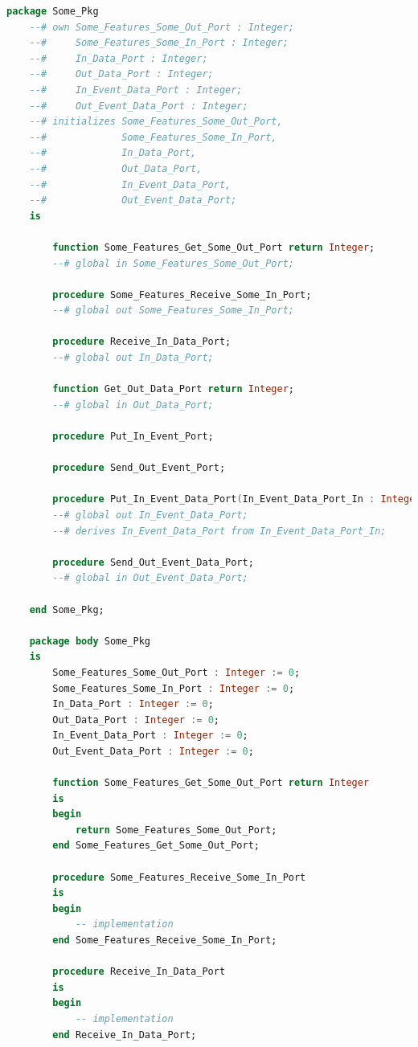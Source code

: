 \singlespacing
\begin{lstlisting}[language=ada, frame=single, gobble=0, caption={Translation of sample AADL package from listing \ref{lst:aadl_sample}}]
	package Some_Pkg
	--# own Some_Features_Some_Out_Port : Integer;
	--#     Some_Features_Some_In_Port : Integer;
	--#     In_Data_Port : Integer;
	--#     Out_Data_Port : Integer;
	--#     In_Event_Data_Port : Integer;
	--#     Out_Event_Data_Port : Integer;
	--# initializes Some_Features_Some_Out_Port,
	--#             Some_Features_Some_In_Port,
	--#             In_Data_Port,
	--#             Out_Data_Port,
	--#             In_Event_Data_Port,
	--#             Out_Event_Data_Port;
	is

	    function Some_Features_Get_Some_Out_Port return Integer;
	    --# global in Some_Features_Some_Out_Port;

	    procedure Some_Features_Receive_Some_In_Port;
	    --# global out Some_Features_Some_In_Port;

	    procedure Receive_In_Data_Port;
	    --# global out In_Data_Port;

	    function Get_Out_Data_Port return Integer;
	    --# global in Out_Data_Port;

	    procedure Put_In_Event_Port;

	    procedure Send_Out_Event_Port;

	    procedure Put_In_Event_Data_Port(In_Event_Data_Port_In : Integer);
	    --# global out In_Event_Data_Port;
	    --# derives In_Event_Data_Port from In_Event_Data_Port_In;

	    procedure Send_Out_Event_Data_Port;
	    --# global in Out_Event_Data_Port;

	end Some_Pkg;

	package body Some_Pkg
	is
	    Some_Features_Some_Out_Port : Integer := 0;
	    Some_Features_Some_In_Port : Integer := 0;
	    In_Data_Port : Integer := 0;
	    Out_Data_Port : Integer := 0;
	    In_Event_Data_Port : Integer := 0;
	    Out_Event_Data_Port : Integer := 0;

	    function Some_Features_Get_Some_Out_Port return Integer
	    is
	    begin
	        return Some_Features_Some_Out_Port;
	    end Some_Features_Get_Some_Out_Port;

	    procedure Some_Features_Receive_Some_In_Port
	    is
	    begin
	        -- implementation
	    end Some_Features_Receive_Some_In_Port;

	    procedure Receive_In_Data_Port
	    is
	    begin
	        -- implementation
	    end Receive_In_Data_Port;


\end{lstlisting}
